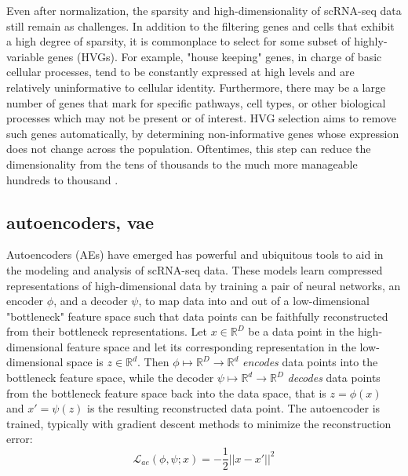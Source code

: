 Even after normalization, the sparsity and high-dimensionality of scRNA-seq data still remain as challenges.
In addition to the filtering genes and cells that exhibit a high degree of sparsity, it is commonplace to select for some subset of highly-variable genes (HVGs).
For example, "house keeping" genes, in charge of basic cellular processes, tend to be constantly expressed at high levels and are relatively uninformative to cellular identity.
Furthermore, there may be a large number of genes that mark for specific pathways, cell types, or other biological processes which may not be present or of interest.
HVG selection aims to remove such genes automatically, by determining non-informative genes whose expression does not change across the population.
Oftentimes, this step can reduce the dimensionality from the tens of thousands to the much more manageable hundreds to thousand \cite{satija2015,zheng2017,stuart2019}.

\subsection{autoencoders, vae} \label{sec:autoencoders}
Autoencoders (AEs) have emerged has powerful and ubiquitous tools to aid in the modeling and analysis of scRNA-seq data.
These models learn compressed representations of high-dimensional data by training a pair of neural networks, an encoder $\phi$, and a decoder $\psi$,
to map data into and out of a low-dimensional "bottleneck" feature space such that data points can be faithfully reconstructed from their bottleneck representations.
Let $x \in \mathbb{R}^D$ be a data point in the high-dimensional feature space and let its corresponding representation in the low-dimensional space is $z \in \mathbb{R}^d$.
Then $\phi \mapsto \mathbb{R}^D \to \mathbb{R}^d$ \emph{encodes} data points into the bottleneck feature space,
while the decoder $\psi \mapsto \mathbb{R}^d \to \mathbb{R}^D$ \emph{decodes} data points from the bottleneck feature space back into the data space,
that is $z = \phi(x)$ and $x\prime = \psi(z)$ is the resulting reconstructed data point.
The autoencoder is trained, typically with gradient descent methods \cite{kingma2017} to minimize the reconstruction error:
\begin{equation}
  \mathcal{L}_{ae}(\phi, \psi; x) = -\frac{1}{2} || x - x\prime ||^2
  \label{eq:ae-loss}
\end{equation}

